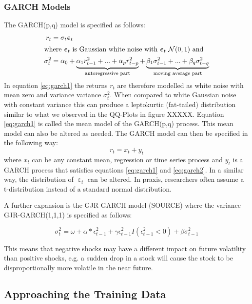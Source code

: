 \subsubsection{GARCH Models}
The GARCH(p,q) model is specified as follows:
\begin{align}
    r_{t} &= \sigma_t  \upepsilon_t \label{eq:garch1}\\
\intertext{where $\upepsilon_t$ is Gaussian white noise with  $\upepsilon_t ~ \mathcal{N}(0,1)$ and}
    \sigma^2_t &= \alpha_0 + \underbrace{\alpha_1 r^2_{t-1} + ... + \alpha_p r^2_{t-p}}_\text{autoregressive part} + \underbrace{\beta_1 \sigma^2_{t-1} + ... + \beta_q \sigma^2_{t-q}}_\text{moving average part} \label{eq:garch2}
\end{align}{}
In equation \ref{eq:garch1} the returns $r_t$ are therefore modelled as white noise with mean zero and variance variance $\sigma^2_t$. When compared to white Gaussian noise with constant variance this can produce a leptokurtic (fat-tailed) distribution similar to what we observed in the QQ-Plots in figure XXXXX. Equation \ref{eq:garch1} is called the mean model of the GARCH(p,q) process. This mean model can also be altered as needed. The GARCH model can then be specified in the following way: 
\begin{equation}
    r_t = x_t + y_t
\end{equation}{}
where $x_t$ can be any constant mean, regression or time series process and $y_t$ is a GARCH process that satisfies equations \ref{eq:garch1} and \ref{eq:garch2}. In a similar way, the distribution of $\upepsilon_t$ can be altered. In praxis, researchers often assume a t-distribution instead of a standard normal distribution. 

A further expansion is the GJR-GARCH model (SOURCE) where the variance GJR-GARCH(1,1,1) is specified as follows: 

\begin{equation}
    \sigma^2_t = \omega + \alpha * \epsilon^2_{t-1} + \gamma \epsilon^2_{t-1} I(\epsilon^2_{t-1} < 0) + \beta \sigma^2_{t-1} 
\end{equation}{}

This means that negative shocks may have a different impact on future volatility than positive shocks, e.g. a sudden drop in a stock will cause the stock to be disproportionally more volatile in the near future. 



\subsection{Approaching the Training Data}
